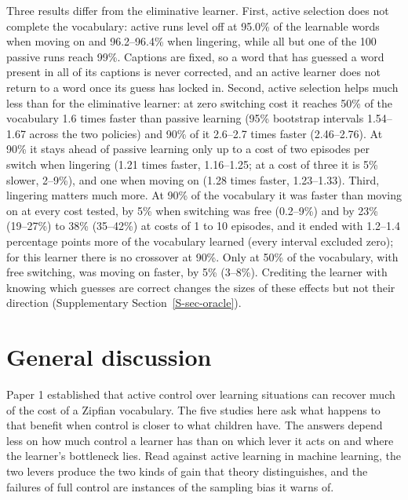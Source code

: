 \documentclass[a4paper,natbib,man]{apa6}
\begin{document}
Three results differ from the eliminative learner. First, active selection does not complete the vocabulary: active runs level off at 95.0\% of the learnable words when moving on and 96.2--96.4\% when lingering, while all but one of the 100 passive runs reach 99\%. Captions are fixed, so a word that has guessed a word present in all of its captions is never corrected, and an active learner does not return to a word once its guess has locked in. Second, active selection helps much less than for the eliminative learner: at zero switching cost it reaches 50\% of the vocabulary 1.6 times faster than passive learning (95\% bootstrap intervals 1.54--1.67 across the two policies) and 90\% of it 2.6--2.7 times faster (2.46--2.76). At 90\% it stays ahead of passive learning only up to a cost of two episodes per switch when lingering (1.21 times faster, 1.16--1.25; at a cost of three it is 5\% slower, 2--9\%), and one when moving on (1.28 times faster, 1.23--1.33). Third, lingering matters much more. At 90\% of the vocabulary it was faster than moving on at every cost tested, by 5\% when switching was free (0.2--9\%) and by 23\% (19--27\%) to 38\% (35--42\%) at costs of 1 to 10 episodes, and it ended with 1.2--1.4 percentage points more of the vocabulary learned (every interval excluded zero); for this learner there is no crossover at 90\%. Only at 50\% of the vocabulary, with free switching, was moving on faster, by 5\% (3--8\%). Crediting the learner with knowing which guesses are correct changes the sizes of these effects but not their direction (Supplementary Section~\ref{S-sec-oracle}).

\section{General discussion}

Paper 1 established that active control over learning situations can recover much of the cost of a Zipfian vocabulary. The five studies here ask what happens to that benefit when control is closer to what children have. The answers depend less on how much control a learner has than on which lever it acts on and where the learner's bottleneck lies. Read against active learning in machine learning, the two levers produce the two kinds of gain that theory distinguishes, and the failures of full control are instances of the sampling bias it warns of.
\end{document}
